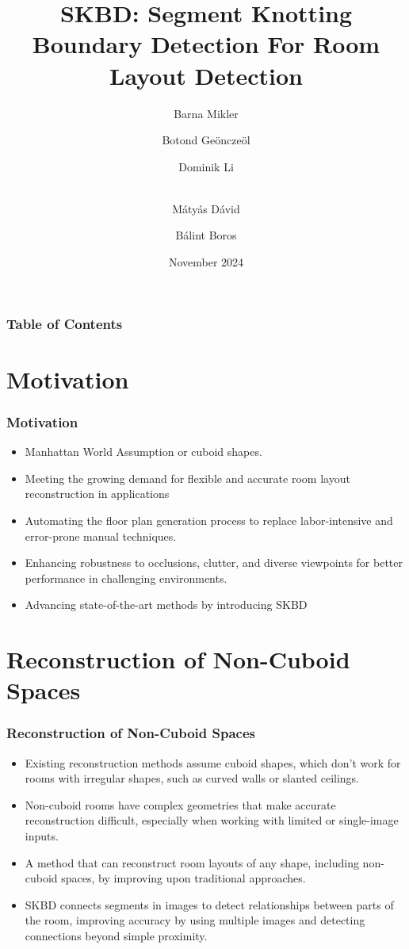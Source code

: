 \documentclass{beamer}
\title[SKBD] {SKBD: Segment Knotting Boundary Detection For Room Layout Detection}
\author[Pictures]
{Barna Mikler \and Botond Geönczeöl \and Dominik Li \and \\ Mátyás Dávid \and Bálint Boros}
\institute[ELTE]{Eötvös Loránd University \\ Faculty of Informatics}
\date[2024] {November 2024}
\begin{document}
\frame{\titlepage}

\begin{frame}
\frametitle{Table of Contents}
\tableofcontents
\end{frame}  

\section{Motivation}
\begin{frame}
\frametitle{Motivation}
\begin{itemize}
    \item Manhattan World Assumption or cuboid shapes.
    \item Meeting the growing demand for flexible and accurate room layout reconstruction in applications
    \item Automating the floor plan generation process to replace labor-intensive and error-prone manual techniques.
    \item Enhancing robustness to occlusions, clutter, and diverse viewpoints for better performance in challenging environments.
    \item Advancing state-of-the-art methods by introducing SKBD
\end{itemize}

\end{frame}

\section{Reconstruction of Non-Cuboid Spaces}
\begin{frame}
\frametitle{Reconstruction of Non-Cuboid Spaces}
\begin{itemize}
\item Existing reconstruction methods assume cuboid shapes, which don’t work for rooms with irregular shapes, such as curved walls or slanted ceilings.
\item Non-cuboid rooms have complex geometries that make accurate reconstruction difficult, especially when working with limited or single-image inputs.
\item A method that can reconstruct room layouts of any shape, including non-cuboid spaces, by improving upon traditional approaches.
\item SKBD connects segments in images to detect relationships between parts of the room, improving accuracy by using multiple images and detecting connections beyond simple proximity.
\end{itemize}
\end{frame}
\end{document}
